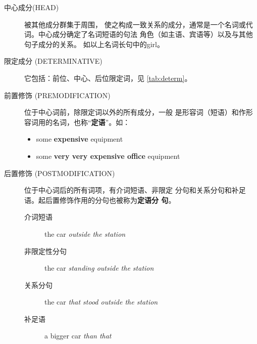\begin{description}
\item[中心成分(HEAD)] 被其他成分群集于周围，
  使之构成一致关系的成分，通常是一个名词或代词。中心成分确定了名词短语的句法
  角色（如主语、宾语等）以及与其他句子成分的关系。 如以上名词长句中的girl。

\item[限定成分 (DETERMINATIVE)] 它包括：前位、中心、后位限定词，见 \cref{tab:determ}。

\item[前置修饰 (PREMODIFICATION)] 位于中心词前，除限定词以外的所有成分，一般
  是形容词（短语）和作形容词用的名词，也称“\textbf{定语}”。如：
  \begin{itemize}
  \item some \textbf{expensive} equipment
  \item some \textbf{very very expensive office} equipment
  \end{itemize}

\item[后置修饰 (POSTMODIFICATION)] 位于中心词后的所有词项，有介词短语、非限定
  分句和关系分句和补足语。起后置修饰作用的分句也被称为\textbf{定语分
    句}。 
  \begin{description}
  \item[介词短语] the car \emph{outside the station}
  \item[非限定性分句] the car \emph{standing outside the station}
  \item[关系分句] the car \emph{that stood outside the station}
  \item[补足语] a bigger car \emph{than that}
  \end{description}

\end{description}



